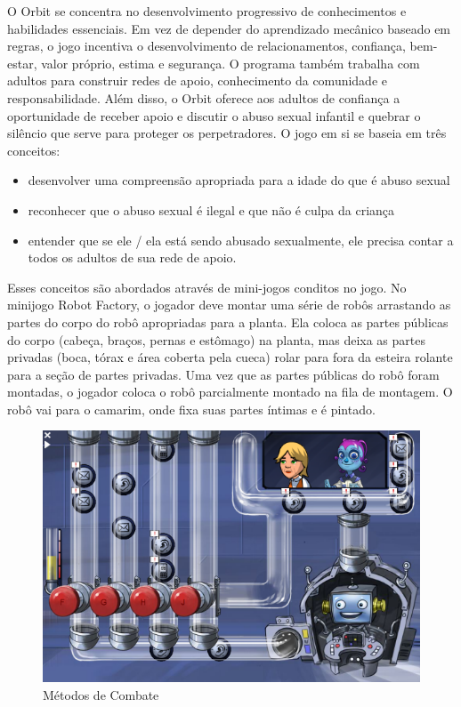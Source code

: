 \newpage


O Orbit se concentra no desenvolvimento progressivo de conhecimentos e habilidades essenciais. Em vez de depender do aprendizado mecânico baseado em regras, o jogo incentiva o desenvolvimento de relacionamentos, confiança, bem-estar, valor próprio, estima e segurança. O programa também trabalha com adultos para construir redes de apoio, conhecimento da comunidade e responsabilidade. Além disso, o Orbit oferece aos adultos de confiança a oportunidade de receber apoio e discutir o abuso sexual infantil e quebrar o silêncio que serve para proteger os perpetradores. O jogo em si se baseia em três conceitos: 

\begin{itemize}
  \item desenvolver uma compreensão apropriada para a idade do que é abuso sexual
  \item reconhecer que o abuso sexual é ilegal e que não é culpa da criança
  \item entender que se ele / ela está sendo abusado sexualmente, ele precisa contar a todos os adultos de sua rede de apoio.
\end{itemize}

Esses conceitos são abordados através de mini-jogos conditos no jogo. No minijogo Robot Factory, o jogador deve montar uma série de robôs arrastando as partes do corpo do robô apropriadas para a planta. Ela coloca as partes públicas do corpo (cabeça, braços, pernas e estômago) na planta, mas deixa as partes privadas (boca, tórax e área coberta pela cueca) rolar para fora da esteira rolante para a seção de partes privadas. Uma vez que as partes públicas do robô foram montadas, o jogador coloca o robô parcialmente montado na fila de montagem. O robô vai para o camarim, onde fixa suas partes íntimas e é pintado.


\begin{figure}[htb]

	\caption{\label{fig:Riscos}Métodos de Combate}
  \begin{center}
    \includegraphics[width=0.6\linewidth]{./Figuras/Orbit/need-to-tell.png}
	\end{center}

\end{figure}

